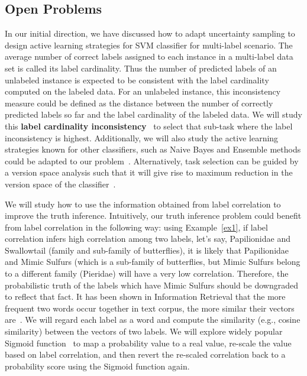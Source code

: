 \subsection{Open Problems}
\vspace{-0.1in}

In our initial direction, we have discussed how to adapt uncertainty sampling to design active learning strategies for SVM classifier for multi-label scenario. The average number of correct labels assigned to each instance in a multi-label data set is called its label cardinality. Thus the number of predicted  labels of an unlabeled instance is expected to be consistent with the label cardinality computed on the labeled data. For an unlabeled instance, this inconsistency measure could be defined as the distance between the number of correctly predicted labels so far and the label cardinality of the labeled data. We will study this {\bf label cardinality inconsistency}~\cite{tsoumakas2006multi} to select that sub-task where the label inconsistency is highest.
Additionally, we will also study the active learning strategies known for other classifiers, such as Naive Bayes and Ensemble methods could be adapted to our problem~\cite{multi0,multi1,multi2,multi3}. Alternatively, task selection can be guided by a version space analysis such that it will give rise to maximum reduction in the version space of the classifier~\cite{versionspace}.

 We will study how to use the information obtained from label correlation to improve the truth inference. Intuitively, our truth inference problem could benefit from label correlation in the following way: using Example~\ref{ex1}, if label correlation infers high correlation among two labels, let's say, Papilionidae and Swallowtail (family and sub-family of butterflies), it is likely that  Papilionidae and Mimic Sulfurs (which is a sub-family of butterflies, but Mimic Sulfurs belong to a different family (Pieridae) will have a very low correlation. Therefore, the probabilistic truth of the labels which have Mimic Sulfurs should be downgraded to reflect that fact. It has been shown in Information Retrieval that the more frequent two words occur together in text corpus, the more similar their vectors are~\cite{baeza1999modern}. We will regard each label as a word and compute the similarity (e.g., cosine similarity) between the vectors of two labels. We will explore widely popular Sigmoid function~\cite{ito1992approximation} to map a probability value to a real value, re-scale the value based on label correlation, and then revert the re-scaled correlation back to a probability score using the Sigmoid function again. 


